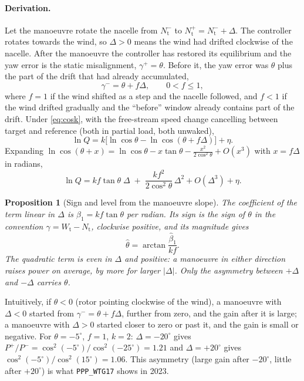 \documentclass[11pt,a4paper]{article}
\newtheorem{proposition}{Proposition}
\theoremstyle{remark}
\newcommand{\dg}{^{\circ}}
\newcommand{\code}[1]{\texttt{#1}}
\newcommand{\Wt}{W_{\mathrm{t}}}
\newcommand{\Nt}{N_{\mathrm{t}}}
\begin{document}
\paragraph{Derivation.} Let the manoeuvre rotate the nacelle from $\Nt^-$ to
$\Nt^+=\Nt^-+\Delta$. The controller rotates towards the wind, so $\Delta>0$
means the wind had drifted clockwise of the nacelle. After the manoeuvre the
controller has restored its equilibrium and the yaw error is the static
misalignment, $\gamma^+=\theta$. Before it, the yaw error was $\theta$ plus the
part of the drift that had already accumulated,
\begin{equation}
  \gamma^- = \theta + f\Delta,\qquad 0<f\le1 ,
  \label{eq:gamma_before}
\end{equation}
where $f=1$ if the wind shifted as a step and the nacelle followed, and $f<1$ if
the wind drifted gradually and the ``before'' window already contains part of
the drift. Under \eqref{eq:cosk}, with the free-stream speed change cancelling
between target and reference (both in partial load, both unwaked),
\begin{equation}
  \ln Q = k\big[\ln\cos\theta - \ln\cos(\theta+f\Delta)\big] + \eta .
  \label{eq:lnQ_model}
\end{equation}
Expanding $\ln\cos(\theta+x)=\ln\cos\theta - x\tan\theta - \tfrac{x^2}{2\cos^2\theta}+O(x^3)$
with $x=f\Delta$ in radians,
\begin{equation}
  \ln Q = k f \tan\theta\;\Delta \;+\; \frac{k f^2}{2\cos^2\theta}\,\Delta^2 + O(\Delta^3) + \eta .
  \label{eq:lnQ_expand}
\end{equation}
\begin{proposition}[Sign and level from the manoeuvre slope]\label{prop:c4}
The coefficient of the term linear in $\Delta$ is $\beta_1 = k f\tan\theta$ per
radian. Its sign is the sign of $\theta$ in the convention $\gamma=\Wt-\Nt$,
clockwise positive, and its magnitude gives
\begin{equation}
  \hat\theta = \arctan\frac{\hat\beta_1}{k f} .
  \label{eq:c4_theta}
\end{equation}
The quadratic term is even in $\Delta$ and positive: a manoeuvre in either
direction raises power on average, by more for larger $|\Delta|$. Only the
\emph{asymmetry} between $+\Delta$ and $-\Delta$ carries $\theta$.
\end{proposition}
Intuitively, if $\theta<0$ (rotor pointing clockwise of the wind), a manoeuvre
with $\Delta<0$ started from $\gamma^-=\theta+f\Delta$, further from zero, and
the gain after it is large; a manoeuvre with $\Delta>0$ started closer to zero
or past it, and the gain is small or negative. For $\theta=-5\dg$, $f=1$,
$k=2$: $\Delta=-20\dg$ gives $P^+/P^-=\cos^2(-5\dg)/\cos^2(-25\dg)=1.21$ and
$\Delta=+20\dg$ gives $\cos^2(-5\dg)/\cos^2(15\dg)=1.06$. This asymmetry (large
gain after $-20\dg$, little after $+20\dg$) is what \code{PPP\_WTG17} shows in
2023.
\end{document}
